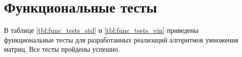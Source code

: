 


\clearpage


\clearpage

\section{Функциональные тесты}

В таблице \ref{tbl:func_tests_std} и \ref{tbl:func_tests_vin} приведены функциональные тесты для разработанных реализаций алгоритмов умножения матриц. Все тесты пройдены успешно.

